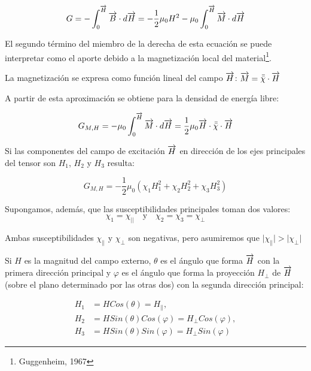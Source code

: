 \begin{equation}
	\label{eq:612}
	G = -\int_{0}^{\overrightarrow{H}}\overrightarrow{B}\cdot d \overrightarrow{H}=
	-\dfrac{1}{2}\mu_{0}H^{2}-\mu_{0}\int_{0}^{\overrightarrow{H}}\overrightarrow{M} \cdot d \overrightarrow{H}
\end{equation}

El segundo término del miembro de la derecha de esta ecuación se puede interpretar como el aporte debido a la magnetización local del material\footnote{Guggenheim, 1967}.

La magnetización se expresa como función lineal del campo $\overrightarrow{H}$: $\overrightarrow{M}= \bar{\bar{\chi}} \cdot \overrightarrow{H}$

A partir de esta aproximación se obtiene para la densidad de energía libre:

\begin{equation}
	\label{eq:613}
	G_{M,H} = -\mu_{0}\int_{0}^{\overrightarrow{H}}\overrightarrow{M} \cdot d \overrightarrow{H}= \dfrac{1}{2}\mu_{0}\overrightarrow{H}\cdot \bar{\bar{\chi}} \cdot \overrightarrow{H}
\end{equation}

Si las componentes del campo de excitación $\overrightarrow{H}$ en dirección de los ejes principales del tensor son $H_{1}$, $H_{2}$ y $H_{3}$ resulta:

\begin{equation}
	\label{eq:614}
	G_{M,H} = -\dfrac{1}{2}\mu_{0}(\chi_{1}H_{1}^{2}+\chi_{2}H_{2}^{2}+\chi_{3}H_{3}^{2})
\end{equation}

Supongamos, además, que las susceptibilidades principales toman dos valores:
\begin{equation}
	\label{eq:615}
	\chi_{1}= \chi_{\vert\vert} \quad \text{y} \quad \chi_{2}=\chi_{3}=\chi_{\perp}
\end{equation}

Ambas susceptibilidades $\chi_{\parallel}$ y $\chi_{\perp}$ son negativas, pero asumiremos que 
$\vert \chi_{\parallel} \vert > \vert \chi_{\perp} \vert$

Si $H$ es la magnitud del campo externo, $\theta$ es el ángulo que forma $\overrightarrow{H}$ con la primera dirección principal y $\varphi$ es el ángulo que forma la proyección $H_{\perp}$ de $\overrightarrow{H}$ (sobre el plano determinado por las otras dos) con la segunda dirección principal:

\begin{equation}
\begin{aligned}
	\label{eq:616}
	H_{1} &= HCos(\theta)= H_{\parallel},\\
	H_{2} &= HSin(\theta)Cos(\varphi) = H_{\perp}Cos(\varphi),\\
	H_{3} & =HSin(\theta)Sin(\varphi) = H_{\perp}Sin(\varphi)
\end{aligned}
\end{equation}

